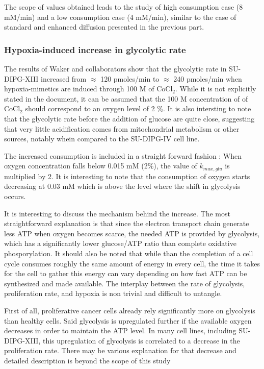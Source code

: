 \documentclass[11pt,a4paper]{article}
\begin{document}
The scope of values obtained leads to the study of high consumption case (8 mM/min) and a low consumption case (4 mM/min), similar to the case of standard and enhanced diffusion presented in the previous part. 
 

\subsubsection{Hypoxia-induced increase in glycolytic rate}
The results of Waker and collaborators show that the glycolytic rate in SU-DIPG-XIII increased from $\approx$ 120 pmoles/min to $\approx$ 240 pmoles/min when hypoxia-mimetics are induced through 100 \textmu M of CoCl$_2$. While it is not explicitly stated in the document, it can be assumed that the 100 \textmu M concentration of of CoCl$_2$ should correspond to an oxygen level of 2 \%. It is also intersting to note that the glycolytic rate before the addition of glucose are quite close, suggesting that very little acidification comes from mitochondrial metabolism or other sources, notably whein compared to the SU-DIPG-IV cell line.

The increased consumption is included in a straight forward fashion : When oxygen concentration falls below 0.015 mM (2\%), the value of $k_{max,glu}$ is multiplied by 2. It is interesting to note that the consumption of oxygen starts decreasing at 0.03 mM which is above the level where the shift in glycolysis occurs.

It is interesting to discuss the mechanism behind the increase. The most straightforward explanation is that since the electron transport chain generate less ATP when oxygen becomes scarce, the needed ATP is provided by glycolysis, which has a significantly lower glucose/ATP ratio than complete oxidative phosporylation. It should also be noted that while than the completion of a cell cycle consumes roughly the same amount of energy in every cell, the time it takes for the cell to gather this energy can vary depending on how fast ATP can be synthesized and made available. The interplay between the rate of glycolysis, proliferation rate, and hypoxia is non trivial and difficult to untangle. 

First of all, proliferative cancer cells already rely significantly more on glycolysis than healthy cells.\cite{Shen2020}\cite{Ruas2018}\cite{Berg2006} Said glycolysis is upregulated further if the available oxygen decreases in order to maintain the ATP level.\cite{Kierans2021} In many cell lines, including SU-DIPG-XIII, this upregulation of glycolysis is correlated to a decrease in the proliferation rate. There may be various explanation for that decrease and detailed description is beyond the scope of this study
\end{document}
